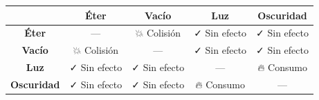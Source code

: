 \begin{center}
\begin{tabularx}{0.85\linewidth}{|c|c|c|c|c|}
\hline
\rowcolor{HammerRed!20} & \textbf{Éter} & \textbf{Vacío} & \textbf{Luz} & \textbf{Oscuridad} \\ \hline
\textbf{Éter}      & —           & 💥 Colisión & ✓ Sin efecto & ✓ Sin efecto \\ \hline
\textbf{Vacío}     & 💥 Colisión & —           & ✓ Sin efecto & ✓ Sin efecto \\ \hline
\textbf{Luz}       & ✓ Sin efecto & ✓ Sin efecto & —           & 🔥 Consumo \\ \hline
\textbf{Oscuridad} & ✓ Sin efecto & ✓ Sin efecto & 🔥 Consumo  & — \\ \hline
\end{tabularx}
\end{center}
